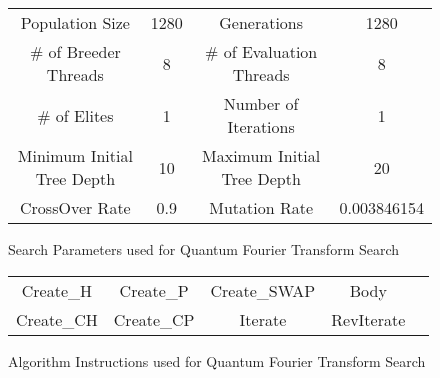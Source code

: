 \begin{figure}[h!]
\begin{center}
 \begin{tabular}{|cc|cc|}
\hline
  Population Size & 1280 & Generations & 1280 \\
  \# of Breeder Threads & 8 & \# of Evaluation Threads & 8 \\
  \# of Elites & 1 & Number of Iterations & 1 \\
  Minimum Initial Tree Depth & 10 & Maximum Initial Tree Depth & 20 \\
  CrossOver Rate & 0.9 & Mutation Rate & 0.003846154 \\
\hline
 \end{tabular}

\end{center}
\caption{Search Parameters used for Quantum Fourier Transform Search}
\label{fig:qftparams}
\end{figure}

\begin{figure}[h!]
\begin{center}
 \begin{tabular}{|ccccc|}
\hline
  Create\_H & Create\_P & Create\_SWAP & Body \\
  Create\_CH  & Create\_CP & Iterate & RevIterate\\
\hline
 \end{tabular}
\end{center}
\caption{Algorithm Instructions used for Quantum Fourier Transform Search}
\label{fig:qftgates}
\end{figure}


\clearpage
